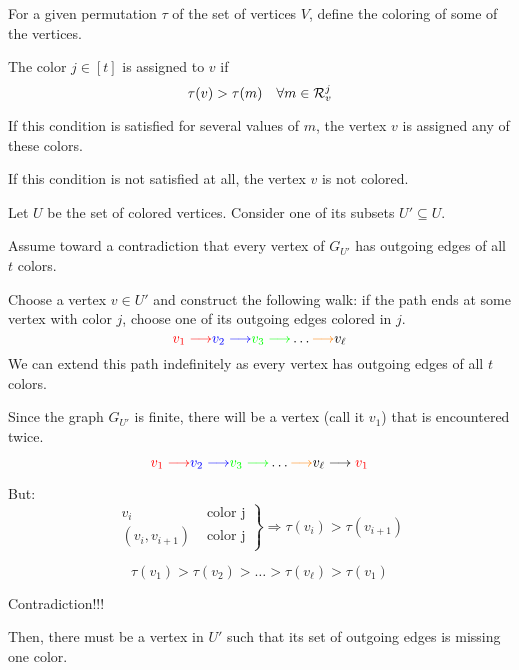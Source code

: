 \begin{frame}
    For a given permutation $\tau$ of the set of vertices $V$, define the coloring of some of the vertices.
    
    The color $j \in [t]$ is assigned to $v$ if
    $$\tau(v) > \tau(m) \quad \forall m \in \mathcal{R}_v^j$$
    
    If this condition is satisfied for several values of $m$, the vertex $v$ is assigned any of these colors.
    
    If this condition is not satisfied at all, the vertex $v$ is not colored.
\end{frame}

\begin{frame}
    Let $U$ be the set of colored vertices. Consider one of its subsets $U' \subseteq U$.
    
    Assume toward a contradiction that every vertex of $G_{U'}$ has outgoing edges of all $t$ colors.
    
    Choose a vertex $v \in U'$ and construct the following walk: if the path ends at some vertex with color $j$, choose one of its outgoing edges colored in $j$.
    $$\textcolor{red}{v_1 \longrightarrow } \textcolor{blue}{v_2 \longrightarrow} \textcolor{green}{v_3 \longrightarrow} \dots \textcolor{orange}{\longrightarrow} v_\ell$$
    We can extend this path indefinitely as every vertex has outgoing edges of all $t$ colors.
\end{frame}

\begin{frame}
    Since the graph $G_{U'}$ is finite, there will be a vertex (call it $v_1$) that is encountered twice.

    $$\textcolor{red}{v_1 \longrightarrow } \textcolor{blue}{v_2 \longrightarrow} \textcolor{green}{v_3 \longrightarrow} \dots \textcolor{orange}{\longrightarrow} v_\ell \longrightarrow \textcolor{red}{v_1}$$
    
    But:
        $$
            \left .
                \begin{matrix}
                    v_i & \mbox{ color j} \\
                    (v_i, v_{i+1}) & \mbox{ color j}
                \end{matrix}
            \right \}
            \Longrightarrow \tau (v_i) > \tau (v_{i+1})
        $$
        
        $$
            \tau (v_1) > \tau (v_2) > \dots > \tau (v_\ell) > \tau (v_1) 
        $$
        
        Contradiction!!!
        
        Then, there must be a vertex in $U'$ such that its set of outgoing edges is missing one color.
        
\end{frame}

